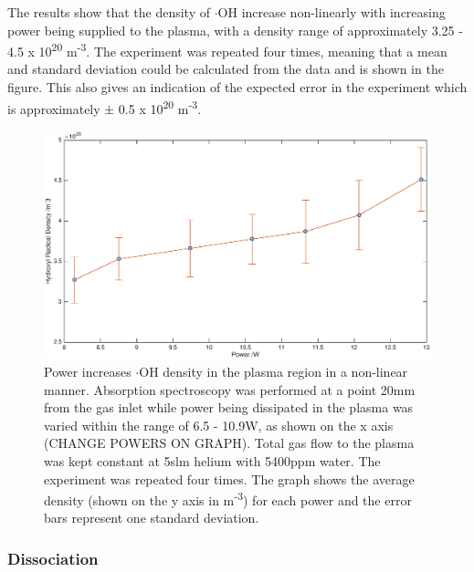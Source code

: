 \documentclass[11pt, oneside]{article}   	%
\begin{document}
The results show that the density of $\cdot$OH increase non-linearly with increasing power being supplied to the plasma, with a density range of approximately 3.25 - 4.5 x 10\textsuperscript{20} m\textsuperscript{-3}.
The experiment was repeated four times, meaning that a mean and standard deviation could be calculated from the data and is shown in the figure. 
This also gives an indication of the expected error in the experiment which is approximately $\pm$ 0.5 x 10\textsuperscript{20} m\textsuperscript{-3}.

\begin{figure}
    \centering
    \includegraphics[width=\textwidth]{Figures/PowerVariation.eps}
    \caption{Power increases $\cdot$OH density in the plasma region in a non-linear manner. Absorption spectroscopy was performed at a point 20mm from the gas inlet while power being dissipated in the plasma was varied within the range of 6.5 - 10.9W, as shown on the x axis (CHANGE POWERS ON GRAPH). Total gas flow to the plasma was kept constant at 5slm helium with 5400ppm water. The experiment was repeated four times. The graph shows the average density (shown on the y axis in m\textsuperscript{-3}) for each power and the error bars represent one standard deviation.}
    \label{fig:PowerVariation}
\end{figure}

\subsubsection{Dissociation}
\end{document}
